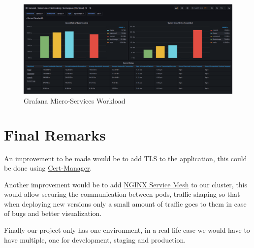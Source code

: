 \documentclass[12pt,a4paper,oneside]{report}
\begin{document}
\begin{figure}[htb]
\centering
\includegraphics[width=1.0\textwidth]{./pictures/grafanamm.png}
\caption{Grafana Micro-Services Workload}
\label{fig:Grafana Micro-Services Workload}
\end{figure}






\chapter{Final Remarks}

An improvement to be made would be to add TLS to the application, this could be done using \href{https://cert-manager.io/}{Cert-Manager}. 

Another improvement would be to add \href{https://www.nginx.com/products/nginx-service-mesh}{NGINX Service Mesh} to our cluster, this would allow securing the communication between pods, traffic shaping so that when deploying new versions only a small amount of traffic goes to them in case of bugs and better visualization.

Finally our project only has one environment, in a real life case we would have to have multiple, one for development, staging and production.


\cleardoublepage
%
\end{document}
